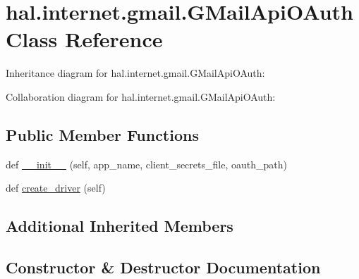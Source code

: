 \hypertarget{classhal_1_1internet_1_1gmail_1_1_g_mail_api_o_auth}{}\section{hal.\+internet.\+gmail.\+G\+Mail\+Api\+O\+Auth Class Reference}
\label{classhal_1_1internet_1_1gmail_1_1_g_mail_api_o_auth}


Inheritance diagram for hal.\+internet.\+gmail.\+G\+Mail\+Api\+O\+Auth\+:


Collaboration diagram for hal.\+internet.\+gmail.\+G\+Mail\+Api\+O\+Auth\+:
\subsection*{Public Member Functions}
\begin{DoxyCompactItemize}
\item 
def \hyperlink{classhal_1_1internet_1_1gmail_1_1_g_mail_api_o_auth_af9b7b7899716bf62bbc61729a716ae1e}{\+\_\+\+\_\+init\+\_\+\+\_\+} (self, app\+\_\+name, client\+\_\+secrets\+\_\+file, oauth\+\_\+path)
\item 
def \hyperlink{classhal_1_1internet_1_1gmail_1_1_g_mail_api_o_auth_a4b2742dfb8c231c5f7f51d278e247a85}{create\+\_\+driver} (self)
\end{DoxyCompactItemize}
\subsection*{Additional Inherited Members}


\subsection{Constructor \& Destructor Documentation}

